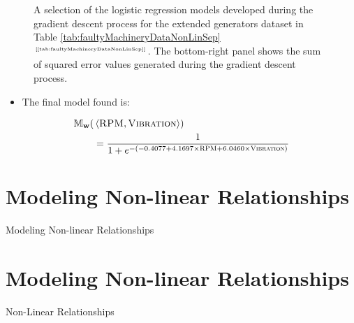 \documentclass[xcolor={table}]{beamer}
\newcommand{\SectionSlideShortHeader}[3][]{
	\ifthenelse{\isempty{#1}}
		{\section[#3]{#2}\begin{frame} \begin{center}\begin{huge}#2\end{huge}\end{center}\end{frame}}
		{\section[#1]{#2}\begin{frame} \begin{center}\begin{huge}#3\end{huge}\end{center}\end{frame}}
}
\newcommand{\featN}[1]{\textsc{#1}}
\newcommand{\ourRef}[1]{\ref{#1} $^{\text{\tiny[\pageref{#1}]}}$}
\begin{document}
\begin{frame} [plain]
\begin{footnotesize}
\begin{figure}[htb]
\begin{center}
\caption{A selection of the logistic regression models developed during the gradient descent process for the extended generators dataset in Table \ourRef{tab:faultyMachineryDataNonLinSep}. The bottom-right panel shows the sum of squared error values generated during the gradient descent process.}
\label{fig:machineryBadSepGradientDescentSmallMultiples}
\end{center}
\end{figure}
\end{footnotesize}
\end{frame} 

 \begin{frame} 
 \begin{itemize}
 \item The final model found is:
 \end{itemize}
  
\begin{alignat*}{2}
		\mathbb{M}_{\mathbf{w}}(&\left< \featN{RPM},  \featN{Vibration} \right>) \\
		& = \frac{1}{1+e^{-(-0.4077 + 4.1697 \times \featN{RPM} + 6.0460 \times \featN{Vibration} )}}
		\label{eqn:faultyMachineryLogisticExample}
\end{alignat*}
\end{frame} 

\SectionSlideShortHeader{Modeling Non-linear Relationships}{Non-Linear Relationships}
\end{document}
